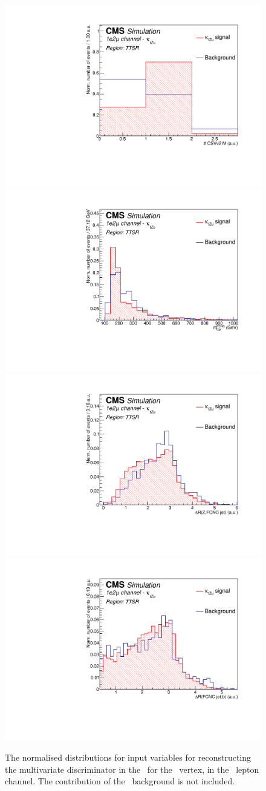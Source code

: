 \begin{figure}[htbp]
	\includegraphics[width=0.3\linewidth]{6_Search/Figures/PlotsTechnics/NJets_CSVv2MZuttoppairuue_norm}
	\includegraphics[width=0.3\linewidth]{6_Search/Figures/PlotsTechnics/FCNCtop_MZuttoppairuue_norm}
	\includegraphics[width=0.3\linewidth]{6_Search/Figures/PlotsTechnics/dRZcZuttoppairuue_norm}
	\includegraphics[width=0.3\linewidth]{6_Search/Figures/PlotsTechnics/dRSMjetLightjetZuttoppairuue_norm}
	\caption{The normalised distributions for input variables for reconstructing the multivariate discriminator in the \TTSR\ for the \Zut\ vertex, in the \emumu\ lepton channel. The contribution of the \NPL\ background is not included.}
	\label{fig:toppairZutnormalizeduue}
\end{figure}

